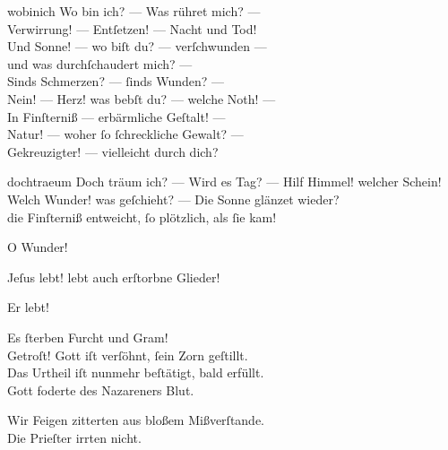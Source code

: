 \documentclass[shorttitlesize=50,tocstyle=ref-genre]{ees}
\begin{document}
{  \begin{movement}{wobinich}
    Wo bin ich? — Was rühret mich? —\\
    Verwirrung! — Entſetzen! — Nacht und Tod!\\
    Und Sonne! — wo biſt du? — verſchwunden —\\
    und was durchſchaudert mich? —\\
    Sinds Schmerzen? — ſinds Wunden? —\\
    Nein! — Herz! was bebſt du? — welche Noth! —\\
    In Finſterniß — erbärmliche Geſtalt! —\\
    Natur! — woher ſo ſchreckliche Gewalt? —\\
    Gekreuzigter! — vielleicht durch dich?
  \end{movement}

  \begin{movement}{dochtraeum}
    Doch träum ich? — Wird es Tag? — Hilf Himmel! welcher Schein!\\
    Welch Wunder! was geſchieht? — Die Sonne glänzet wieder?\\
    die Finſterniß entweicht, ſo plötzlich, als ſie kam!

    O Wunder!

    \hspace*{3cm} Jeſus lebt! lebt auch erſtorbne Glieder!\\\strut

    Er lebt!\\\strut

    \hspace*{3cm}Es ſterben Furcht und Gram!\\
    Getroſt! Gott iſt verſöhnt, ſein Zorn geſtillt.\\
    Das Urtheil iſt nunmehr beſtätigt, bald erfüllt.\\
    Gott foderte des Nazareners Blut.

    Wir Feigen zitterten aus bloßem Mißverſtande.\\
    Die Prieſter irrten nicht.


\end{movement}}
\end{document}
